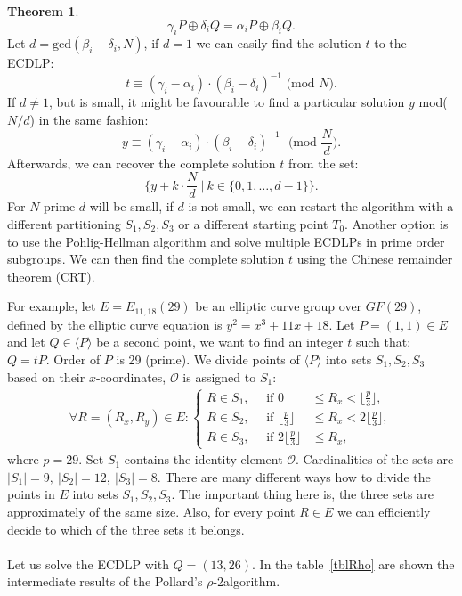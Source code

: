 \documentclass[thesis=M,english]{FITthesis}[2012/10/20]
\theoremstyle{remark}
\theoremstyle{definition}
\newtheorem{theorem}{Theorem}[section]
\begin{document}
\begin{theorem}
$$
\gamma_iP \oplus \delta_iQ = \alpha_iP \oplus \beta_iQ.
$$
Let $d = \text{gcd}(\beta_i - \delta_i, N)$, if $d=1$ we can easily find the solution $t$ to the ECDLP:
$$
t \equiv (\gamma_i - \alpha_i)\cdot(\beta_i - \delta_i)^{-1} \text{ (mod $N$)}.
$$
If $d \neq 1$, but is small, it might be favourable to find a particular solution $y$ mod($N/d$) in the same fashion:
$$
y \equiv (\gamma_i - \alpha_i)\cdot(\beta_i - \delta_i)^{-1} \text{ $\bigg($mod $\frac{N}{d}\bigg)$}.
$$
Afterwards, we can recover the complete solution $t$ from the set:
$$
\bigg\{y + k\cdot\frac{N}{d}\ \bigg| \ k \in \{0, 1, \ldots, d -1\}\bigg\}.
$$
For $N$ prime $d$ will be small, if $d$ is not small, we can restart the algorithm with a different partitioning $S_1,S_2,S_3$ or a different starting point $T_0$. Another option is to use the Pohlig-Hellman algorithm and solve multiple ECDLPs in prime order subgroups. We can then find the complete solution $t$ using the Chinese remainder theorem (CRT).
\end{theorem}
\noindent For example, let $E = E_{11,18}(29)$ be an elliptic curve group over $GF(29)$, defined by the elliptic curve equation is $y^2 = x^3 + 11x + 18$. Let $P = (1,1) \in E$ and let $Q \in \langle P \rangle$ be a second point, we want to find an integer $t$ such that: $Q = tP.$
Order of $P$ is 29 (prime). We divide points of $\langle P \rangle$ into sets $S_1,S_2,S_3$ based on their $x$-coordinates, $\mathcal{O}$ is assigned to $S_1$:
\begin{align*}
\forall R = (R_x, R_y) \in E: \begin{cases} R \in S_1, \quad \text{ if } 0 &\leq R_x < \big\lfloor\frac{p}{3}\big\rfloor, \\ 
R \in S_2, \quad \text{ if } \big\lfloor\frac{p}{3}\big\rfloor &\leq R_x < 2\big\lfloor\frac{p}{3}\big\rfloor, \\
R \in S_3, \quad \text{ if } 2\big\lfloor\frac{p}{3}\big\rfloor &\leq R_x, 
\end{cases}
\end{align*}
where $p = 29.$ 
Set $S_1$ contains the identity element $\mathcal{O}$. Cardinalities of the sets are $|S_1| = 9,\ |S_2| = 12, \ |S_3| = 8.$ There are many different ways how to divide the points in $E$ into sets $S_1,S_2,S_3$. The important thing here is, the three sets are approximately of the same size. Also, for every point $R \in E$ we can efficiently decide to which of the three sets it belongs. \\ \\
\noindent Let us solve the ECDLP with $Q=(13,26)$. In the table~\ref{tblRho} are shown the intermediate results of the Pollard's $\rho$-2algorithm.
\end{document}
